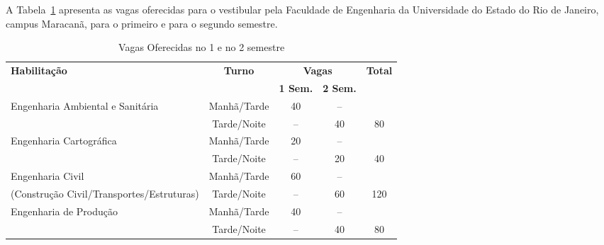 A Tabela~\ref{tabvagas} apresenta as vagas oferecidas para o vestibular pela Faculdade de Engenharia da Universidade do Estado do Rio de Janeiro, campus Maracanã, para o primeiro e para o segundo semestre.
\begin{table}
	\centering
	\caption{Vagas Oferecidas no 1\textordmasculine{} e no 2\textordmasculine{} semestre}
	\label{tabvagas}
	\begin{tabularx}{\textwidth}{|X|c|c|c|c|}
		\hline
		\multirow{2}{*}{\textbf{Habilitação}}                 & \multirow{2}{*}{\textbf{Turno}} & \multicolumn{2}{c|}{\textbf{Vagas}} & \multirow{2}{*}{\textbf{Total}}          \\
		\cline{3-4}                                           &                                 & \textbf{1\textordmasculine{} Sem.}  & \textbf{2\textordmasculine{} Sem.} &     \\
		\hline
		Engenharia Ambiental e Sanitária                      & Manhã/Tarde                     & 40                                  & --                                 &     \\
		                                                      & Tarde/Noite                     & --                                  & 40                                 & 80  \\
		\hline
		Engenharia Cartográfica                               & Manhã/Tarde                     & 20                                  & --                                 &     \\
		                                                      & Tarde/Noite                     & --                                  & 20                                 & 40  \\
		\hline
		Engenharia Civil                                      & Manhã/Tarde                     & 60                                  & --                                 &     \\
		(Construção Civil/Transportes/Estruturas)             & Tarde/Noite                     & --                                  & 60                                 & 120 \\
		\hline
		Engenharia de Produção                                & Manhã/Tarde                     & 40                                  & --                                 &     \\
		                                                      & Tarde/Noite                     & --                                  & 40                                 & 80  \\

\end{tabularx}
\end{table}
